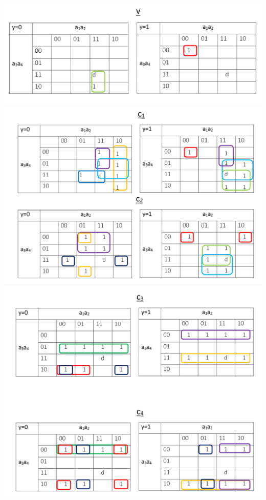 \documentclass{article}
\begin{document}
\begin{enumerate}
       \begin{center}
              \includegraphics[scale=0.8]{v.png}
              \includegraphics[scale=0.8]{c12.png}
              \includegraphics[scale=0.8]{c34.png}
       \end{center}
       

\end{enumerate}
\end{document}
